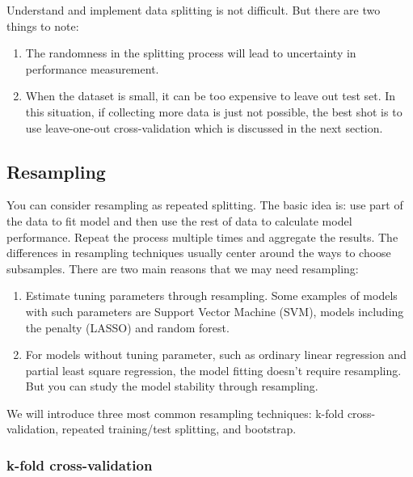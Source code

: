 \documentclass[
  12pt,
]{krantz}
\providecommand{\tightlist}{%
  \setlength{\itemsep}{0pt}\setlength{\parskip}{0pt}}
\begin{document}
Understand and implement data splitting is not difficult. But there are two things to note:

\begin{enumerate}
\def\labelenumi{\arabic{enumi}.}
\tightlist
\item
  The randomness in the splitting process will lead to uncertainty in performance measurement.
\item
  When the dataset is small, it can be too expensive to leave out test set. In this situation, if collecting more data is just not possible, the best shot is to use leave-one-out cross-validation which is discussed in the next section.
\end{enumerate}

\hypertarget{resampling}{%
\subsection{Resampling}\label{resampling}}

You can consider resampling as repeated splitting. The basic idea is: use part of the data to fit model and then use the rest of data to calculate model performance. Repeat the process multiple times and aggregate the results. The differences in resampling techniques usually center around the ways to choose subsamples. There are two main reasons that we may need resampling:

\begin{enumerate}
\def\labelenumi{\arabic{enumi}.}
\item
  Estimate tuning parameters through resampling. Some examples of models with such parameters are Support Vector Machine (SVM), models including the penalty (LASSO) and random forest.
\item
  For models without tuning parameter, such as ordinary linear regression and partial least square regression, the model fitting doesn't require resampling. But you can study the model stability through resampling.
\end{enumerate}

We will introduce three most common resampling techniques: k-fold cross-validation, repeated training/test splitting, and bootstrap.

\hypertarget{k-fold-cross-validation}{%
\subsubsection{k-fold cross-validation}\label{k-fold-cross-validation}}
\end{document}
